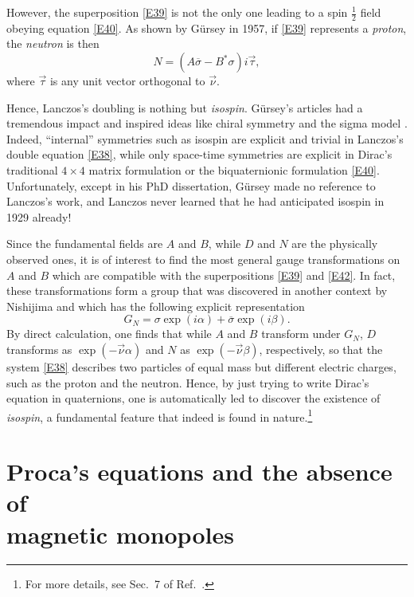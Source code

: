 \documentclass [12pt,a4paper      ]{article}
\newcommand{\CON}{\overline}          %
\begin{document}
     However,  the superposition \eqref{E39} is not the only one leading 
to  a  spin $\tfrac{1}{2}$ field obeying equation \eqref{E40}.   As shown by  G\"ursey  in 1957,  if \eqref{E39} represents a \emph{proton},  the \emph{neutron} is then \cite{R31,R32}
%
\begin{equation}\label{E42}
               N = ( A \CON{\sigma} - B^* \sigma) i \vec{\tau},     %
\end{equation}
%
where $\vec{\tau}$ is any unit vector orthogonal to $\vec{\nu}$.

     Hence,  Lanczos's doubling is nothing but \emph{isospin}.   G\"ursey's 
articles  had  a tremendous impact \cite{R27} and inspired  ideas  like 
chiral  symmetry  and the sigma model  \cite{R32}.  Indeed,  ``internal'' 
symmetries  such as isospin are explicit and trivial in  Lanczos's 
double  equation  \eqref{E38},   while  only  space-time  symmetries are 
explicit  in  Dirac's traditional $4 \times 4$ matrix formulation  or  the 
biquaternionic formulation \eqref{E40}.   Unfortunately,  except in  his 
PhD dissertation,  G\"ursey made no reference to Lanczos's work, and 
Lanczos  never  learned  that he had anticipated isospin  in  1929 
already!

     Since the fundamental fields are $A$ and $B$, while $D$ and $N$ are 
the physically observed ones,  it is of interest to find the most 
general  gauge  transformations on $A$ and $B$ which  are  compatible 
with  the  superpositions \eqref{E39}  and \eqref{E42}.    In fact,   these 
transformations  form a group that was discovered in  another 
context  by  Nishijima \cite{R33} and which has the following  explicit 
representation 
%
\begin{equation}\label{E43}
     G_N  = \sigma \exp(i\alpha) + \CON{\sigma} \exp(i\beta).   %
\end{equation}
%
By  direct  calculation,  one finds that while $A$ and $B$ transform under 
$G_N$, $D$ transforms as $\exp(-\vec{\nu} \alpha)$
   and $N$ as $\exp(-\vec{\nu} \beta)$, 
respectively,  so that the system \eqref{E38} describes two particles of 
equal  mass but different  electric charges,  such as the  proton 
and the neutron.  Hence, by just trying to write Dirac's equation 
in  quaternions,   one  is  automatically  led  to  discover  the 
existence of \emph{isospin},  a fundamental feature that indeed is found 
in nature.\footnote{For more details, see Sec.~7 of Ref.~\cite{R35}.}


\section{Proca's equations and the absence of\\ magnetic monopoles} 
\label{pro:0}
\end{document}
